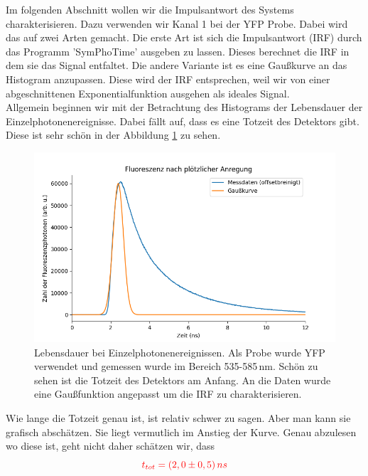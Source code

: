Im folgenden Abschnitt wollen wir die Impulsantwort des Systems charakterisieren. Dazu verwenden wir Kanal 1 bei der YFP Probe. Dabei wird das auf zwei Arten gemacht. 
Die erste Art ist sich die Impulsantwort (IRF) durch das Programm 'SymPhoTime' ausgeben zu lassen. Dieses berechnet die IRF in dem 
sie das Signal entfaltet. Die andere Variante ist es eine Gaußkurve an das Histogram anzupassen. Diese wird der IRF entsprechen, 
weil wir von einer abgeschnittenen Exponentialfunktion ausgehen als ideales Signal.\\
Allgemein beginnen wir mit der Betrachtung des Histograms der Lebensdauer der Einzelphotonenereignisse. Dabei fällt auf, dass es eine Totzeit des 
Detektors gibt. Diese ist sehr schön in der Abbildung \ref{bild:IRFGaussian} zu sehen.\\
\begin{figure}[h]
    \centering
    \includegraphics[width = \linewidth]{Bilder/Auswertung/IRFGaussian.png}
    \caption{Lebensdauer bei Einzelphotonenereignissen. Als Probe wurde YFP verwendet und gemessen wurde im Bereich 535-585\,nm. Schön zu sehen ist die Totzeit des Detektors am Anfang. 
    An die Daten wurde eine Gaußfunktion angepasst um die IRF zu charakterisieren.}
    \label{bild:IRFGaussian}
\end{figure}

Wie lange die Totzeit genau ist, ist relativ schwer zu sagen. Aber man kann sie grafisch abschätzen. Sie liegt vermutlich im Anstieg 
der Kurve. Genau abzulesen wo diese ist, geht nicht daher schätzen wir, dass\\

\begin{equation*}
    \textcolor{red}{t_{tot} = (2,0\pm0,5)\,ns}
\end{equation*}

